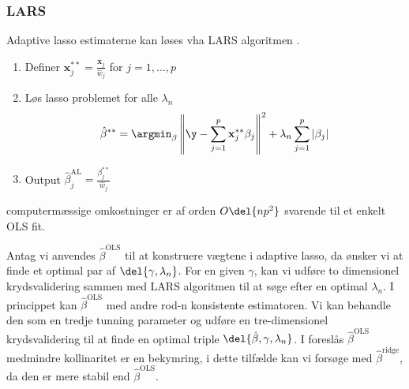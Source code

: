 \subsubsection{LARS}
Adaptive lasso estimaterne kan løses vha LARS algoritmen \citep{efron}.
\begin{enumerate}
\item Definer \(\mathbf{x}_j^{**} = \frac{\mathbf{x}_j}{\hat{w}_j}\) for \(j=1, \ldots, p\)
\item Løs lasso problemet for alle \(\lambda_n\)
\begin{align*}
\hat{\beta}^{**} = \argmin_{\beta} \left\Vert \y - \sum_{j=1}^p \mathbf{x}_j^{**} \beta_j \right\Vert^2 + \lambda_n \sum_{j=1}^p \vert \beta_j \vert
\end{align*}
\item Output \(\hat{\beta}_j^{\text{AL}} = \frac{\beta_j^{**}}{\hat{w}_j}\)
\end{enumerate}
computermæssige omkostninger er af orden \(O\del{np^2}\) svarende til et enkelt OLS fit.

Antag vi anvendes \(\hat{\beta}^\text{OLS}\) til at konstruere vægtene i adaptive lasso, da ønsker vi at finde et optimal par af \(\del{\gamma, \lambda_n}\).
For en given \(\gamma\), kan vi udføre to dimensionel krydsvalidering sammen med LARS algoritmen til at søge efter en optimal \(\lambda_n\).
I princippet kan \(\hat{\beta}^\text{OLS}\) med andre rod-n konsistente estimatoren.
Vi kan behandle den som en tredje tunning parameter og udføre en tre-dimensionel krydsvalidering til at finde en optimal triple \(\del{\hat{\beta}, \gamma, \lambda_n}\).
I \citep{adaptive_lasso} foreslås \(\hat{\beta}^\text{OLS}\) medmindre kollinaritet er en bekymring, i dette tilfælde kan vi forsøge med \(\hat{\beta}^\text{ridge}\), da den er mere stabil end \(\hat{\beta}^\text{OLS}\).
%

